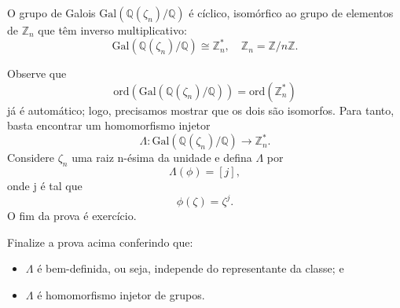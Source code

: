 \documentclass[../algebraIII_notes.tex]{subfiles}
\begin{document}
\begin{prop*}
	O grupo de Galois \(\mathrm{Gal}(\mathbb{Q}(\zeta_{n})/\mathbb{Q})\) é cíclico, isomórfico ao grupo de elementos de \(\mathbb{Z}_{n}\) que têm inverso multiplicativo:
	\[
		\mathrm{Gal}(\mathbb{Q}(\zeta_{n})/\mathbb{Q})\cong \mathbb{Z}_{n}^{*}, \quad \mathbb{Z}_{n} = \mathbb{Z}/n\mathbb{Z}.
	\]
\end{prop*}
\begin{proof*}
	Observe que
	\[
		\mathrm{ord}(\mathrm{Gal}(\mathbb{Q}(\zeta_{n})/\mathbb{Q}))=\mathrm{ord}(\mathbb{Z}_{n}^{*})
	\]
	já é automático; logo, precisamos mostrar que os dois são isomorfos. Para tanto, basta encontrar um homomorfismo injetor
	\[
		\Lambda :\mathrm{Gal}(\mathbb{Q}(\zeta_{n})/\mathbb{Q})\rightarrow \mathbb{Z}_{n}^{*}.
	\]
	Considere \(\zeta_{n}\) uma raiz n-ésima da unidade e defina \(\Lambda \) por
	\[
		\Lambda (\phi ) = [j],
	\]
	onde j é tal que
	\[
		\phi(\zeta ) = \zeta^{j}.
	\]
	O fim da prova é exercício. \qedsymbol
\end{proof*}
\begin{exr}
	Finalize a prova acima conferindo que:
	\begin{itemize}
		\item[1)] \(\Lambda \) é bem-definida, ou seja, independe do representante da classe; e
		\item[2)] \(\Lambda \) é homomorfismo injetor de grupos.
	\end{itemize}
\end{exr}
\end{document}
